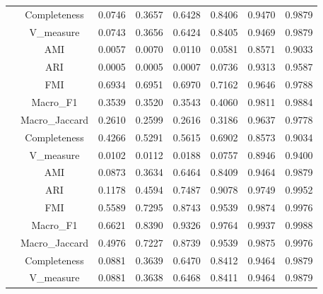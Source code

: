 \begin{table}[ht!]
\begin{tabular*}{\linewidth}{@{} lc c c c c c c @{}}
 & Completeness  & 0.0746 & 0.3657 & 0.6428 & 0.8406 & 0.9470 & 0.9879 \\

 & V_measure  & 0.0743 & 0.3656 & 0.6424 & 0.8405 & 0.9469 & 0.9879 \\
\addlinespace
\multirow{7}{*}{IZGC}
 & AMI  & 0.0057 & 0.0070 & 0.0110 & 0.0581 & 0.8571 & 0.9033 \\

 & ARI  & 0.0005 & 0.0005 & 0.0007 & 0.0736 & 0.9313 & 0.9587 \\

 & FMI  & 0.6934 & 0.6951 & 0.6970 & 0.7162 & 0.9646 & 0.9788 \\

 & Macro_F1  & 0.3539 & 0.3520 & 0.3543 & 0.4060 & 0.9811 & 0.9884 \\

 & Macro_Jaccard  & 0.2610 & 0.2599 & 0.2616 & 0.3186 & 0.9637 & 0.9778 \\

 & Completeness  & 0.4266 & 0.5291 & 0.5615 & 0.6902 & 0.8573 & 0.9034 \\

 & V_measure  & 0.0102 & 0.0112 & 0.0188 & 0.0757 & 0.8946 & 0.9400 \\
\addlinespace
\multirow{7}{*}{K-means++}
 & AMI  & 0.0873 & 0.3634 & 0.6464 & 0.8409 & 0.9464 & 0.9879 \\

 & ARI  & 0.1178 & 0.4594 & 0.7487 & 0.9078 & 0.9749 & 0.9952 \\

 & FMI  & 0.5589 & 0.7295 & 0.8743 & 0.9539 & 0.9874 & 0.9976 \\

 & Macro_F1  & 0.6621 & 0.8390 & 0.9326 & 0.9764 & 0.9937 & 0.9988 \\

 & Macro_Jaccard  & 0.4976 & 0.7227 & 0.8739 & 0.9539 & 0.9875 & 0.9976 \\

 & Completeness  & 0.0881 & 0.3639 & 0.6470 & 0.8412 & 0.9464 & 0.9879 \\

 & V_measure  & 0.0881 & 0.3638 & 0.6468 & 0.8411 & 0.9464 & 0.9879 \\
\bottomrule
\end{tabular*}
\end{table}